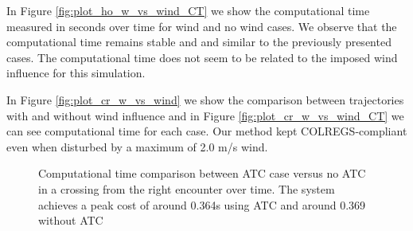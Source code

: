          In Figure \ref{fig:plot_ho_w_vs_wind_CT} we show the computational time measured in seconds over time for wind and no wind cases. We observe that the computational time remains stable and and similar to the previously presented cases. The computational time does not seem to be related to the imposed wind influence for this simulation.
        
        In Figure \ref{fig:plot_cr_w_vs_wind} we show the comparison between trajectories with and without wind influence and in Figure \ref{fig:plot_cr_w_vs_wind_CT} we can see computational time for each case. Our method kept \ac{COLREGS}-compliant even when disturbed by a maximum of 2.0 m/s wind.
        
        \begin{figure}[H]
            \centering
                
                \caption{Computational time comparison between \ac{ATC} case versus no \ac{ATC} in a crossing from the right encounter over time. The system achieves a peak cost of around 0.364s using \ac{ATC} and around 0.369 without \ac{ATC}}
                \label{fig:plot_cr_w_vs_wo_CT}
        \end{figure}
        
